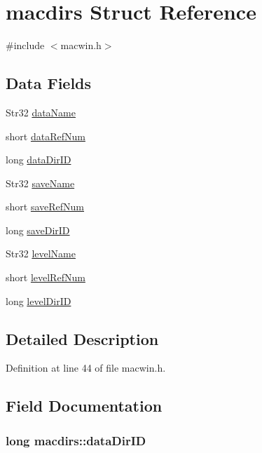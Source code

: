 \hypertarget{structmacdirs}{\section{macdirs Struct Reference}
\label{structmacdirs}
}


{\ttfamily \#include $<$macwin.\+h$>$}

\subsection*{Data Fields}
\begin{DoxyCompactItemize}
\item 
Str32 \hyperlink{structmacdirs_a1080cf50d459ea4cfe4a41a5437829a4}{data\+Name}
\item 
short \hyperlink{structmacdirs_a803339ee5c502383a0fd1c95adc5f238}{data\+Ref\+Num}
\item 
long \hyperlink{structmacdirs_acb3952b06a7f1b1c3b79af045ba99d71}{data\+Dir\+I\+D}
\item 
Str32 \hyperlink{structmacdirs_a00453ab702aa65bda1bd408d76efc629}{save\+Name}
\item 
short \hyperlink{structmacdirs_aa892776f9ea0b84cf654bee2cf5a0b1f}{save\+Ref\+Num}
\item 
long \hyperlink{structmacdirs_a256ca767b10d11638f1b971e49cbfba6}{save\+Dir\+I\+D}
\item 
Str32 \hyperlink{structmacdirs_a6aac944171948db43f9167f72d7ef4b3}{level\+Name}
\item 
short \hyperlink{structmacdirs_aaf3a71b7feb833f97b975b0cd76a6941}{level\+Ref\+Num}
\item 
long \hyperlink{structmacdirs_a23c17f6b7ea647413e389b3048c1a7ba}{level\+Dir\+I\+D}
\end{DoxyCompactItemize}


\subsection{Detailed Description}


Definition at line 44 of file macwin.\+h.



\subsection{Field Documentation}
\hypertarget{structmacdirs_acb3952b06a7f1b1c3b79af045ba99d71}{
\subsubsection[{data\+Dir\+I\+D}]{\setlength{\rightskip}{0pt plus 5cm}long macdirs\+::data\+Dir\+I\+D}}\label{structmacdirs_acb3952b06a7f1b1c3b79af045ba99d71}


